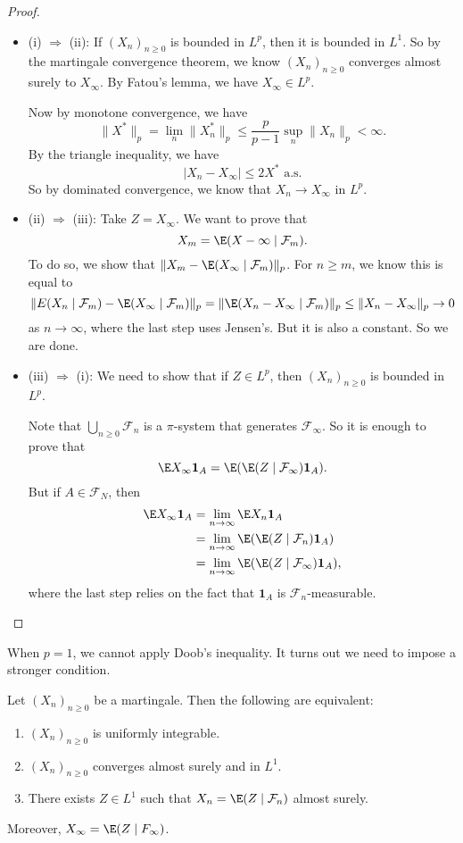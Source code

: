 \documentclass[a4paper]{article}
\begin{document}
\begin{proof}\leavevmode
  \begin{itemize}
    \item (i) $\Rightarrow$ (ii): If $(X_n)_{n \geq 0}$ is bounded in $L^p$, then it is bounded in $L^1$. So by the martingale convergence theorem, we know $(X_n)_{n \geq 0}$ converges almost surely to $X_\infty$. By Fatou's lemma, we have $X_\infty \in L^p$.

      Now by monotone convergence, we have
      \[
        \|X^*\|_p = \lim_n \|X_n^*\|_p \leq \frac{p}{p - 1} \sup_n \|X_n\|_p < \infty.
      \]
      By the triangle inequality, we have
      \[
        |X_n - X_\infty| \leq 2 X^*\text{ a.s.}
      \]
      So by dominated convergence, we know that $X_n \to X_\infty$ in $L^p$.
    \item (ii) $\Rightarrow$ (iii): Take $Z = X_\infty$. We want to prove that
      \[
        X_m = \E(X-\infty \mid \mathcal{F}_m).
      \]
      To do so, we show that $\|X_m - \E(X_\infty \mid \mathcal{F}_m)\|_p$. For $n \geq m$, we know this is equal to
      \[
        \|E(X_n \mid \mathcal{F}_m) - \E(X_\infty \mid \mathcal{F}_m)\|_p = \|\E(X_n - X_\infty \mid \mathcal{F}_m)\|_p \leq \|X_n - X_\infty\|_p \to 0
      \]
      as $n \to \infty$, where the last step uses Jensen's. But it is also a constant. So we are done.
    \item (iii) $\Rightarrow$ (i): We need to show that if $Z \in L^p$, then $(X_n)_{n \geq 0}$ is bounded in $L^p$. %

      Note that $\bigcup_{n \geq 0} \mathcal{F}_n$ is a $\pi$-system that generates $\mathcal{F}_\infty$. So it is enough to prove that
      \[
        \E X_\infty \mathbf{1}_A = \E(\E(Z \mid \mathcal{F}_\infty) \mathbf{1}_A).
      \]
      But if $A \in \mathcal{F}_N$, then
      \begin{align*}
        \E X_\infty \mathbf{1}_A &= \lim_{n \to \infty} \E X_n \mathbf{1}_A\\
        &= \lim_{n \to \infty} \E(\E(Z \mid \mathcal{F}_n) \mathbf{1}_A)\\
        &= \lim_{n \to \infty} \E (\E(Z \mid \mathcal{F}_\infty)\mathbf{1}_A),
      \end{align*}
      where the last step relies on the fact that $\mathbf{1}_A$ is $\mathcal{F}_n$-measurable.
  \end{itemize}
\end{proof}

When $p = 1$, we cannot apply Doob's inequality. It turns out we need to impose a stronger condition.
\begin{thm}[Convergence in $L^1$]
  Let $(X_n)_{n \geq 0}$ be a martingale. Then the following are equivalent:
  \begin{enumerate}
    \item $(X_n)_{n \geq 0}$ is uniformly integrable.
    \item $(X_n)_{n \geq 0}$ converges almost surely and in $L^1$.
    \item There exists $Z \in L^1$ such that $X_n = \E(Z \mid \mathcal{F}_n)$ almost surely.
  \end{enumerate}
  Moreover, $X_\infty = \E(Z \mid F_\infty)$.
\end{thm}
\end{document}

